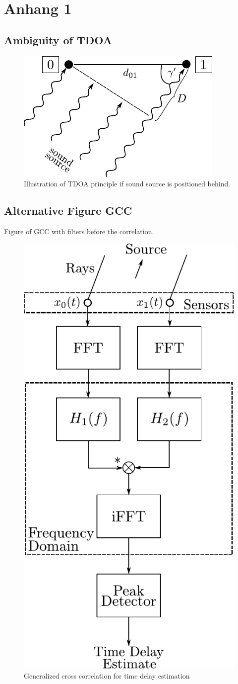 \chapter{Anhang 1}
\label{chap:appendix1}

\section{Ambiguity of \ac{TDOA}}
\label{appendix:a1_tdoaRear}
\begin{figure}[ht]
	\centering
		\includegraphics[width=0.4\columnwidth]{figures/tdoa_waves_rear}
	\caption{Illustration of \ac{TDOA} principle if sound source is positioned behind.}
	\label{fig:ap1_tdoaRear}
\end{figure}

\section{Alternative Figure GCC}
\label{appendix:a1_alternativeGcc}

Figure of \ac{GCC} with filters before the correlation.
\begin{figure}[ht]
	\centering
		\includegraphics[width=0.35\columnwidth]{figures/GCC}
	\caption{Generalized cross correlation for time delay estimation}
	\label{fig:ap1_GCC}
\end{figure}

